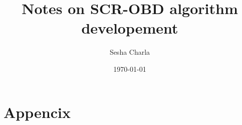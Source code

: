 \documentclass[letterpaper, 11pt]{article}
\title{Notes on SCR-OBD algorithm developement}
\author{Sesha Charla}
\date{\today}
\begin{document}
\maketitle
\tableofcontents
\newpage

\newpage

\newpage

\newpage

\newpage

\newpage

\newpage

\newpage

\newpage
\section{Appencix}


\newpage
\nocite{}


\end{document}
